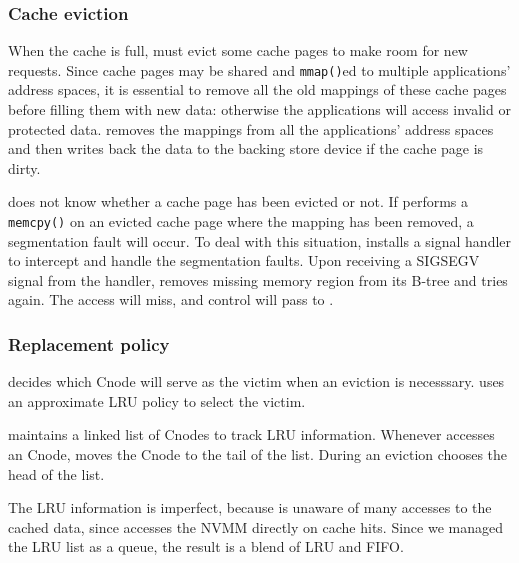\subsubsection{Cache eviction}
\label{sec:evict}

When the cache is full, \drv{} must evict some cache pages to make room for new requests.
Since cache pages may be shared and \texttt{mmap()}ed
to
multiple applications' address spaces, it is essential to remove all the
old mappings of these cache pages before filling them with new data:
otherwise the applications will access invalid or protected data.  \Drv{} removes the
mappings from all the applications' address spaces and then writes back the
data to the backing store device if the cache page is dirty.

\Lib{} does not know whether a cache page has been evicted or not. 
If \lib{} performs a \texttt{memcpy()} on an evicted cache page where the mapping has
been removed, a segmentation fault will occur.  To deal with this situation,
\lib{} installs a signal handler to intercept and handle the segmentation faults.  Upon receiving a SIGSEGV
signal from the handler, \lib{} removes missing memory region 
from its B-tree and tries again. The access will miss, and control will pass to \drv{}. 

\subsubsection{Replacement policy}
\label{sec:replacement}

\Drv{} decides
which Cnode will serve as the victim when an eviction is necesssary.
\drv{} uses
an approximate LRU policy to select the victim.

\drv{} maintains a linked list of Cnodes to track LRU information.
Whenever \drv{} accesses an Cnode, 
\drv{} moves the Cnode to the tail of the list.
During an eviction \drv{} chooses the head of the list.

The LRU information is imperfect, because \drv{} is unaware of many 
accesses to the cached data, since \lib{} accesses the NVMM directly on cache hits.
Since we managed the LRU list as a queue, the result is a blend of LRU and FIFO.


